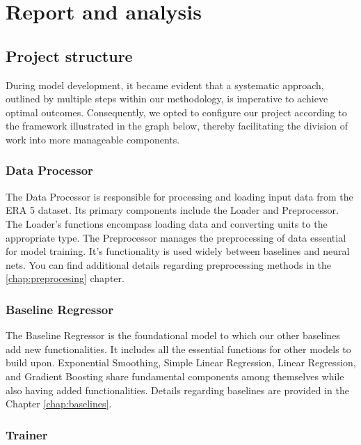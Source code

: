 \chapter{Report and analysis}\label{chap:report}
\section{Project structure}

During model development, it became evident that a systematic approach, outlined by multiple steps within our methodology, is imperative to achieve optimal outcomes. Consequently, we opted to configure our project according to the framework illustrated in the graph below, thereby facilitating the division of work into more manageable components.\\




\subsection{Data Processor}

The Data Processor is responsible for processing and loading input data from the ERA 5 dataset. Its primary components include the Loader and Preprocessor. The Loader's functions encompass loading data and converting units to the appropriate type. The Preprocessor manages the preprocessing of data essential for model training. It's functionality is used widely between baselines and neural nets. You can find additional details regarding preprocessing methods in the \ref{chap:preprocesing} chapter.

\subsection{Baseline Regressor}

The Baseline Regressor is the foundational model to which our other baselines add new functionalities. It includes all the essential functions for other models to build upon. Exponential Smoothing, Simple Linear Regression, Linear Regression, and Gradient Boosting share fundamental components among themselves while also having added functionalities. Details regarding baselines are provided in the Chapter \ref{chap:baselines}.

\subsection{Trainer}

